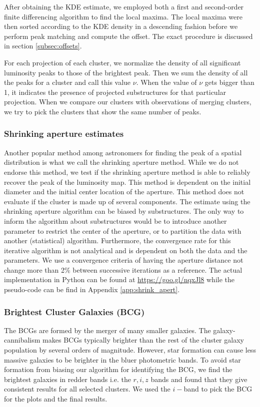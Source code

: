 After obtaining the KDE estimate, we employed both a first and second-order  
finite differencing algorithm to find the local maxima.  
The local maxima were then sorted according to the KDE density in a descending
fashion before we perform peak matching and compute the offset. The exact
procedure is discussed in section \ref{subsec:offsets}. 

For each projection of each cluster, we normalize the density of all significant 
luminosity peaks to those of the brightest peak. 
Then we sum the density of all the peaks for a cluster and call this value
$\nu$. When the value of $\nu$ gets bigger than 1, it indicates the presence 
of projected substructures for that particular projection.
When we compare our clusters with observations of merging clusters, 
we try to pick the clusters that show the same number of peaks. 

\subsubsection{Shrinking aperture estimates}

Another popular method among astronomers for finding the peak of a spatial
distribution is what we call the shrinking aperture method.
While we do not endorse this method,
we test if the shrinking aperture method is able to reliably recover the 
peak of the luminosity map.
This method is dependent on the initial diameter and the initial center 
location of the aperture.
This method does not evaluate if the cluster is made up of
several components.
The estimate using the shrinking aperture algorithm can be biased by
substructures. The only way to inform the algorithm about substructures would
be to introduce another parameter to restrict the center of the aperture, or to
partition the data with another (statistical) algorithm.
Furthermore, the convergence rate for this iterative algorithm is not
analytical and is dependent on both the data and the parameters. We use a
convergence criteria of having the aperture distance not change more than 2\% 
between successive iterations as a reference. The actual implementation in
Python can be found at \href{https://goo.gl/nqxJl8}{https://goo.gl/nqxJl8} while
the pseudo-code can be find in Appendix \ref{app:shrink_apert}.

\subsubsection{Brightest Cluster Galaxies (BCG)}
The BCGs are formed by the merger of many smaller
galaxies. The galaxy-cannibalism makes BCGs typically brighter than the rest of 
the cluster galaxy population by several orders of magnitude. 
However, star formation can cause
less massive galaxies to be brighter in the bluer photometric bands.
To avoid star formation from biasing our algorithm for identifying the
BCG, we find the brightest galaxies in redder bands i.e. the $r, i, z$
bands and found that they give consistent results for all selected clusters. 
We used the $i-$band to pick the BCG for the plots and the final results. 

